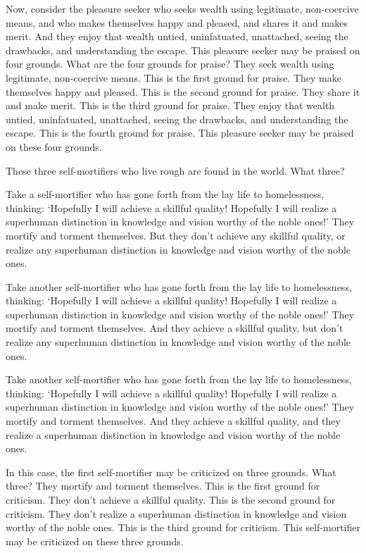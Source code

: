 \documentclass[12pt,openany]{book}%
\begin{document}
Now, consider the pleasure seeker who seeks wealth using legitimate, non-coercive means, and who makes themselves happy and pleased, and shares it and makes merit. And they enjoy that wealth untied, uninfatuated, unattached, seeing the drawbacks, and understanding the escape. This pleasure seeker may be praised on four grounds. What are the four grounds for praise? They seek wealth using legitimate, non-coercive means. This is the first ground for praise. They make themselves happy and pleased. This is the second ground for praise. They share it and make merit. This is the third ground for praise. They enjoy that wealth untied, uninfatuated, unattached, seeing the drawbacks, and understanding the escape. This is the fourth ground for praise. This pleasure seeker may be praised on these four grounds. 

These three self-mortifiers who live rough are found in the world. What three? 

Take a self-mortifier who has gone forth from the lay life to homelessness, thinking: ‘Hopefully I will achieve a skillful quality! Hopefully I will realize a superhuman distinction in knowledge and vision worthy of the noble ones!’ They mortify and torment themselves. But they don’t achieve any skillful quality, or realize any superhuman distinction in knowledge and vision worthy of the noble ones. 

Take another self-mortifier who has gone forth from the lay life to homelessness, thinking: ‘Hopefully I will achieve a skillful quality! Hopefully I will realize a superhuman distinction in knowledge and vision worthy of the noble ones!’ They mortify and torment themselves. And they achieve a skillful quality, but don’t realize any superhuman distinction in knowledge and vision worthy of the noble ones. 

Take another self-mortifier who has gone forth from the lay life to homelessness, thinking: ‘Hopefully I will achieve a skillful quality! Hopefully I will realize a superhuman distinction in knowledge and vision worthy of the noble ones!’ They mortify and torment themselves. And they achieve a skillful quality, and they realize a superhuman distinction in knowledge and vision worthy of the noble ones. 

In this case, the first self-mortifier may be criticized on three grounds. What three? They mortify and torment themselves. This is the first ground for criticism. They don’t achieve a skillful quality. This is the second ground for criticism. They don’t realize a superhuman distinction in knowledge and vision worthy of the noble ones. This is the third ground for criticism. This self-mortifier may be criticized on these three grounds. 
\end{document}
